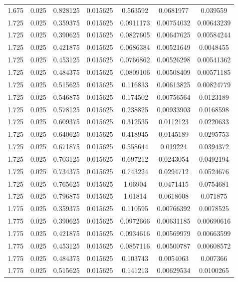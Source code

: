 \begin{table}[bh]
\begin{center}
{\begin{tabular}{ccccccc}
1.675	 & 0.025 & 	0.828125	 & 0.015625	 & 0.563592	 & 0.0681977	 & 0.039559 \\ 
1.725	 & 0.025 & 	0.359375	 & 0.015625	 & 0.0911173	 & 0.00754032	 & 0.00643239 \\ 
1.725	 & 0.025 & 	0.390625	 & 0.015625	 & 0.0827605	 & 0.00647625	 & 0.00584244 \\ 
1.725	 & 0.025 & 	0.421875	 & 0.015625	 & 0.0686384	 & 0.00521649	 & 0.0048455 \\ 
1.725	 & 0.025 & 	0.453125	 & 0.015625	 & 0.0766862	 & 0.00526298	 & 0.00541362 \\ 
1.725	 & 0.025 & 	0.484375	 & 0.015625	 & 0.0809106	 & 0.00508409	 & 0.00571185 \\ 
1.725	 & 0.025 & 	0.515625	 & 0.015625	 & 0.116833	 & 0.00613825	 & 0.00824779 \\ 
1.725	 & 0.025 & 	0.546875	 & 0.015625	 & 0.174502	 & 0.00756564	 & 0.0123189 \\ 
1.725	 & 0.025 & 	0.578125	 & 0.015625	 & 0.238825	 & 0.00933903	 & 0.0168598 \\ 
1.725	 & 0.025 & 	0.609375	 & 0.015625	 & 0.312535	 & 0.0112123	 & 0.0220633 \\ 
1.725	 & 0.025 & 	0.640625	 & 0.015625	 & 0.418945	 & 0.0145189	 & 0.0295753 \\ 
1.725	 & 0.025 & 	0.671875	 & 0.015625	 & 0.558644	 & 0.019224	 & 0.0394372 \\ 
1.725	 & 0.025 & 	0.703125	 & 0.015625	 & 0.697212	 & 0.0243054	 & 0.0492194 \\ 
1.725	 & 0.025 & 	0.734375	 & 0.015625	 & 0.743224	 & 0.0294712	 & 0.0524676 \\ 
1.725	 & 0.025 & 	0.765625	 & 0.015625	 & 1.06904	 & 0.0471415	 & 0.0754681 \\ 
1.725	 & 0.025 & 	0.796875	 & 0.015625	 & 1.01814	 & 0.0618608	 & 0.071875 \\ 
1.775	 & 0.025 & 	0.359375	 & 0.015625	 & 0.110595	 & 0.00766392	 & 0.0078525 \\ 
1.775	 & 0.025 & 	0.390625	 & 0.015625	 & 0.0972666	 & 0.00631185	 & 0.00690616 \\ 
1.775	 & 0.025 & 	0.421875	 & 0.015625	 & 0.0934616	 & 0.00569979	 & 0.00663599 \\ 
1.775	 & 0.025 & 	0.453125	 & 0.015625	 & 0.0857116	 & 0.00500787	 & 0.00608572 \\ 
1.775	 & 0.025 & 	0.484375	 & 0.015625	 & 0.103743	 & 0.0054063	 & 0.007366 \\ 
1.775	 & 0.025 & 	0.515625	 & 0.015625	 & 0.141213	 & 0.00629534	 & 0.0100265 \\ 

\end{tabular}}
\end{center}
\end{table}
